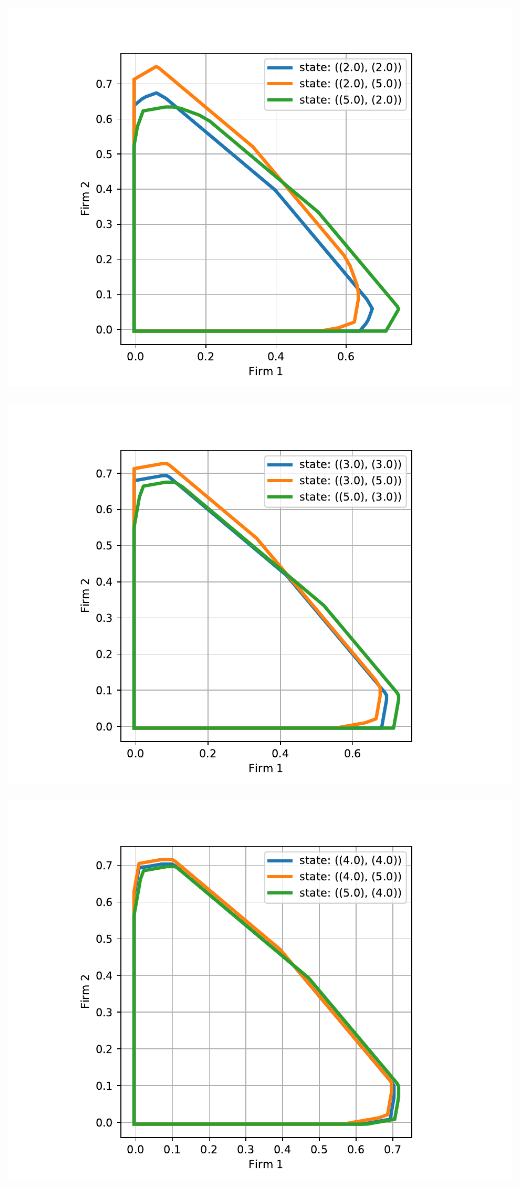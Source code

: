 \documentclass[11pt]{article}
\begin{document}
\includegraphics[width=.9\linewidth]{./img/overlap_14_17_32.pdf}

\includegraphics[width=.9\linewidth]{./img/overlap_21_23_33.pdf}

\includegraphics[width=.9\linewidth]{./img/overlap_28_29_34.pdf}
\end{document}
